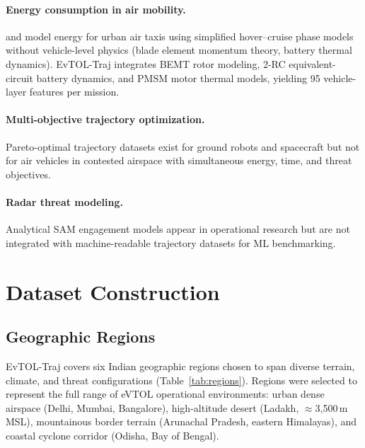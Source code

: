 ﻿\documentclass{article}
\begin{document}
\paragraph{Energy consumption in air mobility.}
\citet{rodrigues2021energy} and \citet{nakamura2023energy} model energy
for urban air taxis using simplified hover--cruise phase models without
vehicle-level physics (blade element momentum theory, battery thermal dynamics).
EvTOL-Traj integrates BEMT rotor modeling, 2-RC equivalent-circuit
battery dynamics, and PMSM motor thermal models, yielding 95 vehicle-layer
features per mission.

\paragraph{Multi-objective trajectory optimization.}
Pareto-optimal trajectory datasets exist for ground robots
\citep{gammell2015batch} and spacecraft \citep{raghavendra2021asteroid}
but not for air vehicles in contested airspace with simultaneous energy,
time, and threat objectives.

\paragraph{Radar threat modeling.}
Analytical SAM engagement models appear in operational research
\citep{bodner1994radar,skolnik2008radar} but are not integrated with
machine-readable trajectory datasets for ML benchmarking.

\section{Dataset Construction}
\label{sec:construction}

\subsection{Geographic Regions}
\label{sec:regions}

EvTOL-Traj covers six Indian geographic regions chosen to span diverse
terrain, climate, and threat configurations (Table~\ref{tab:regions}).
Regions were selected to represent the full range of eVTOL operational
environments: urban dense airspace (Delhi, Mumbai, Bangalore), high-altitude
desert (Ladakh, $\approx$3{,}500\,m MSL), mountainous border terrain
(Arunachal Pradesh, eastern Himalayas), and coastal cyclone corridor
(Odisha, Bay of Bengal).
\end{document}
